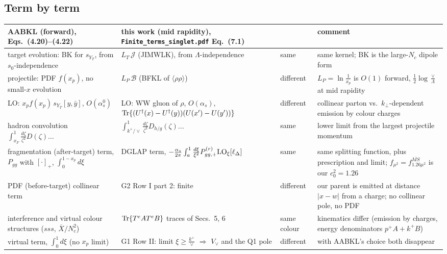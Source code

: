 \documentclass[11pt]{article}
\numberwithin{equation}{section}
\newcommand{\JJ}{\mathcal J}
\newcommand{\BB}{\mathcal B}
\newcommand{\LT}{L_T}
\newcommand{\LP}{L_P}
\begin{document}
\subsection{Term by term}
{\small\renewcommand{\arraystretch}{1.25}
\begin{longtable}{@{}>{\raggedright\arraybackslash}p{}>{\raggedright\arraybackslash}p{}>{\raggedright\arraybackslash}p{}>{\raggedright\arraybackslash}p{}@{}}\toprule
AABKL (forward), Eqs.~(4.20)--(4.22) & this work (mid rapidity), \texttt{Finite\_terms\_singlet.pdf} Eq.~(7.1) & & comment\\\midrule\endhead
target evolution: BK for $s_{Y_T}$, from $s_0$-independence & $\LT\,\JJ$ (JIMWLK), from $\Lambda$-independence & same & same kernel; BK is the large-$N_c$ dipole form\\
projectile: PDF $f(x_p)$, no small-$x$ evolution & $\LP\,\BB$ (BFKL of $\langle\rho\rho\rangle$) & different & $\LP=\ln\frac1{x_p}$ is $O(1)$ forward, $\frac12\log\frac\vee\Lambda$ at mid rapidity\\
LO: $x_pf(x_p)\,s_{Y_T}[y,\bar y]$, $O(\alpha_s^0)$ & LO: WW gluon of $\rho$, $O(\alpha_s)$, ${\rm Tr}\{(U^\dagger(x)-U^\dagger(y))(U(x')-U(y'))\}$ & different & collinear parton vs.\ $k_\perp$-dependent emission by colour charges\\
hadron convolution $\int_{x_F}^1\frac{d\zeta}{\zeta^2}D(\zeta)\dots$ & $\int_{k^+/\vee}^1\frac{d\zeta}{\zeta^3}D_{h/g}(\zeta)\dots$ & same & lower limit from the largest projectile momentum\\
fragmentation (after-target) term, $P_{gg}$ with $[\cdot]_+$, $\int_0^{1-x_p}d\xi$ & DGLAP term, $-\frac{\alpha_s}{2\pi}\int_{a}^1\frac{d\xi}{\xi^2}P^{(r)}_{gg,+}{\rm LO}_\xi[\ell_\Delta]$ & same & same splitting function, plus prescription and limit; $f_{\mu^2}=f^{\overline{MS}}_{1.26\mu^2}$ is our $c_0^2=1.26$\\
PDF (before-target) collinear term & G2 Row I part 2: finite & different & our parent is emitted at distance $|x-w|$ from a charge; no collinear pole, no PDF\\
interference and virtual colour structures ($sss$, $\overline X/N_c^2$) & ${\rm Tr}\{T^eAT^eB\}$ traces of Secs.~5, 6 & same colour & kinematics differ (emission by charges, energy denominators $p^+A+k^+B$)\\
virtual term, $\int_0^1d\xi$ (no $x_p$ limit) & G1 Row II: limit $\xi\ge\frac{k^+}{\vee}$ $\Rightarrow$ $V_\vee$ and the Q1 pole & different & with AABKL's choice both disappear\\

\end{longtable}}
\end{document}
